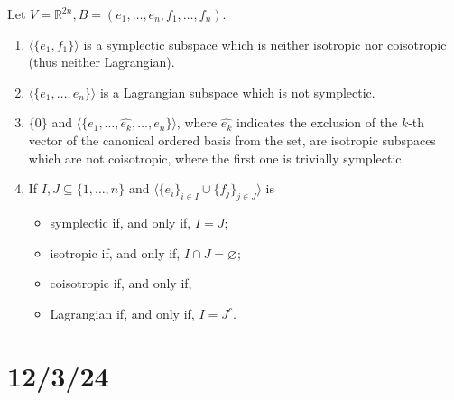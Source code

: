 \documentclass[12pt]{book}
\begin{document}
\begin{Exp}\label{Exp: Symplectic, isotropic, coisotropic and Lagrangian subspaces}
    Let $V=\mathbb{R}^{2n}, B=(e_1,\dots,e_n,f_1,\dots,f_n)$.

    \begin{enumerate}[label=\ExpLbl]
    
        \item $\langle \{e_1, f_1\} \rangle$ is a symplectic subspace which is neither isotropic nor coisotropic (thus neither Lagrangian).

        \item $\langle \{e_1,\dots,e_n\} \rangle$ is a Lagrangian subspace which is not symplectic.

        \item $\{0\}$ and $\langle \{e_1,\dots,\hat{e_k},\dots,e_n\} \rangle$, where $\hat{e_k}$ indicates the exclusion of the $k$-th vector of the canonical ordered basis from the set, are isotropic subspaces which are not coisotropic, where the first one is trivially symplectic.

        \item If $I,J\subseteq \{1,\dots,n\}$ and $\langle \{e_i\}_{i\in I}\cup\{f_j\}_{j\in J} \rangle$ is
            \begin{itemize}
            
                \item symplectic if, and only if, $I=J$;

                \item isotropic if, and only if, $I\cap J=\varnothing$;

                \item coisotropic if, and only if, 

                \item Lagrangian if, and only if, $I=J^c$.
            \end{itemize}
    \end{enumerate}
\end{Exp}

\section*{12/3/24}\label{Sec: 12/3/24}
\end{document}
